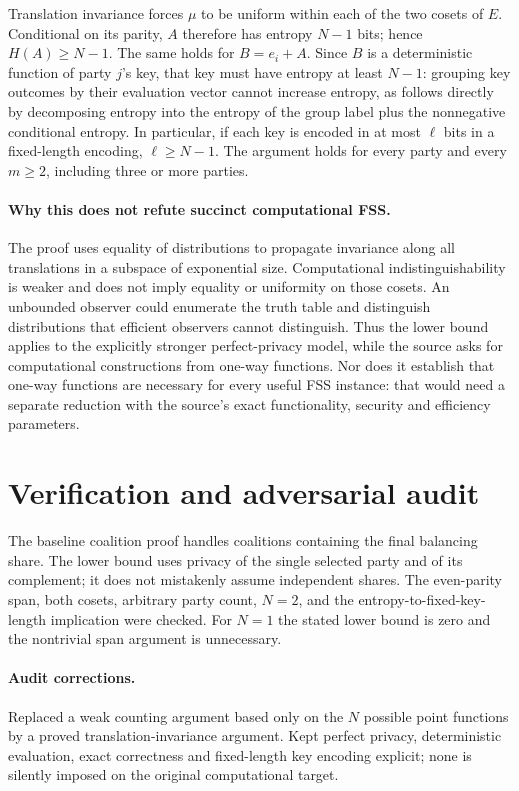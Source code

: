 \documentclass[11pt]{article}
\begin{document}
Translation invariance forces $\mu$ to be uniform within each of the two cosets of $E$. Conditional on its parity, $A$ therefore has entropy $N-1$ bits; hence $H(A)\ge N-1$. The same holds for $B=e_i+A$. Since $B$ is a deterministic function of party $j$'s key, that key must have entropy at least $N-1$: grouping key outcomes by their evaluation vector cannot increase entropy, as follows directly by decomposing entropy into the entropy of the group label plus the nonnegative conditional entropy. In particular, if each key is encoded in at most $\ell$ bits in a fixed-length encoding, $\ell\ge N-1$. The argument holds for every party and every $m\ge2$, including three or more parties.

\paragraph{Why this does not refute succinct computational FSS.}
The proof uses equality of distributions to propagate invariance along all translations in a subspace of exponential size. Computational indistinguishability is weaker and does not imply equality or uniformity on those cosets. An unbounded observer could enumerate the truth table and distinguish distributions that efficient observers cannot distinguish. Thus the lower bound applies to the explicitly stronger perfect-privacy model, while the source asks for computational constructions from one-way functions. Nor does it establish that one-way functions are necessary for every useful FSS instance: that would need a separate reduction with the source's exact functionality, security and efficiency parameters.
\section{Verification and adversarial audit}
The baseline coalition proof handles coalitions containing the final balancing share. The lower bound uses privacy of the single selected party and of its complement; it does not mistakenly assume independent shares. The even-parity span, both cosets, arbitrary party count, $N=2$, and the entropy-to-fixed-key-length implication were checked. For $N=1$ the stated lower bound is zero and the nontrivial span argument is unnecessary.
\paragraph{Audit corrections.} Replaced a weak counting argument based only on the $N$ possible point functions by a proved translation-invariance argument. Kept perfect privacy, deterministic evaluation, exact correctness and fixed-length key encoding explicit; none is silently imposed on the original computational target.
\end{document}
